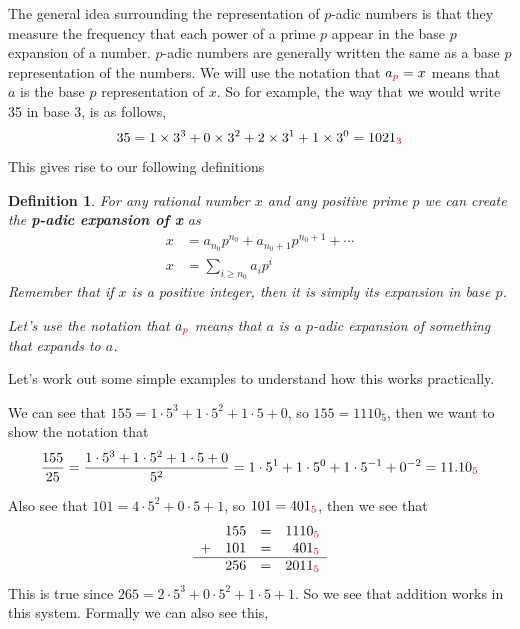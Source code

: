 \documentclass[11pt]{article}
\newtheorem{definition}{Definition}[section]
\newcommand*\inb[1]{_{\textcolor{red}{#1}}}
\newcommand{\padic}{$p$-adic }
\begin{document}
The general idea surrounding the representation of \padic numbers is that they measure the frequency that each power of a prime $p$ appear in the base $p$ expansion of a number. \padic numbers are generally written the same as a base $p$ representation of the numbers. We will use the notation that $a\inb{p}=x$ means that $a$ is the base $p$ representation of $x$. So for example, the way that we would write 35 in base 3, is as follows,
\[
  35 = 1 \times 3^3 + 0 \times 3^2 + 2 \times 3^1 + 1 \times 3^0 = 1021 \inb{3}
\]
This gives rise to our following definitions
\begin{definition}
  For any rational number $x$ and any positive prime $p$ we can create the \textbf{p-adic expansion of x} as
  \begin{align*}
    x & = a_{n_0}p^{n_0} + a_{n_0+1}p^{n_0+1} + \cdots \\
    x & = \sum_{i\geq n_0} a_i p^i
  \end{align*}
  Remember that if $x$ is a positive integer, then it is simply its expansion in base $p$.

  Let's use the notation that $a\inb{p}$ means that $a$ is a \padic expansion of something that expands to $a$.
\end{definition}

Let's work out some simple examples to understand how this works practically.

We can see that $155=1\cdot 5^3+ 1 \cdot 5^2 + 1 \cdot 5 + 0$, so $155=1110_5$, then we want to show the notation that
\[
  \frac{155}{25} = \frac{1\cdot 5^3+ 1 \cdot 5^2 + 1 \cdot 5 + 0}{5^2} = 1\cdot 5^1+ 1 \cdot 5^0 + 1 \cdot 5^{-1} + 0^{-2} = 11.10\inb{5}
\]

Also see that $101=4\cdot 5^2 +0 \cdot 5+ 1$, so $101=401\inb{5}$, then we see that
\begin{align*}
  \begin{matrix}
    ~ & 155 & = & 1110\inb{5}           \\
    + & 101 & = & \phantom{1}401\inb{5} \\
    \hline
    ~ & 256 & = & 2011\inb{5}           \\
  \end{matrix}
\end{align*}
This is true since $265 =2\cdot 5^3 + 0\cdot 5^2 + 1 \cdot 5 + 1$. So we see that addition works in this system. Formally we can also see this,
\end{document}
